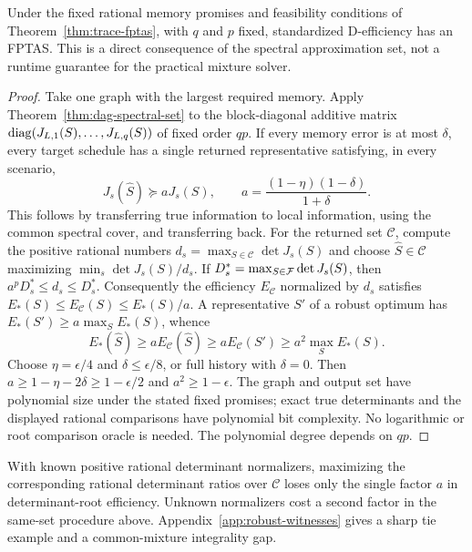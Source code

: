 \begin{corollary}\label{cor:robust-fptas}
Under the fixed rational memory promises and feasibility conditions of
Theorem~\ref{thm:trace-fptas}, with $q$ and $p$ fixed, standardized
D-efficiency has an FPTAS. This is a direct consequence of the spectral
approximation set, not a runtime guarantee for the practical mixture solver.
\end{corollary}
\begin{proof}
Take one graph with the largest required memory. Apply
Theorem~\ref{thm:dag-spectral-set} to the block-diagonal additive matrix
$\operatorname{diag}(J_{L,1}(S),\ldots,J_{L,q}(S))$ of fixed order $qp$.
If every memory error is at most $\delta$, every target schedule has a
single returned representative satisfying, in every scenario,
\begin{equation}\label{eq:robust-cover-factor}
 J_s(\widehat S)\succeq aJ_s(S),\qquad
 a=\frac{(1-\eta)(1-\delta)}{1+\delta}.
\end{equation}
This follows by transferring true information to local information, using
the common spectral cover, and transferring back. For the returned set
$\mathcal C$, compute the positive rational numbers
$d_s=\max_{S\in\mathcal C}\det J_s(S)$ and choose $\widehat S\in\mathcal C$
maximizing $\min_s\det J_s(S)/d_s$. If
$D_s^*=\max_{S\in\mathcal F}\det J_s(S)$, then
$a^pD_s^*\le d_s\le D_s^*$. Consequently the efficiency $E_{\mathcal C}$
normalized by $d_s$ satisfies
$E_*(S)\le E_{\mathcal C}(S)\le E_*(S)/a$.
A representative $S'$ of a robust optimum has
$E_*(S')\ge a\max_S E_*(S)$, whence
\[
 E_*(\widehat S)\ge a E_{\mathcal C}(\widehat S)
 \ge a E_{\mathcal C}(S')\ge a^2\max_S E_*(S).
\]
Choose $\eta=\epsilon/4$ and $\delta\le\epsilon/8$, or full history
with $\delta=0$. Then $a\ge1-\eta-2\delta\ge1-\epsilon/2$ and
$a^2\ge1-\epsilon$. The graph and output set have polynomial size under
the stated fixed promises; exact true determinants and the displayed
rational comparisons have polynomial bit complexity. No logarithmic or
root comparison oracle is needed. The polynomial degree depends on $qp$.
\end{proof}
With known positive rational determinant normalizers, maximizing the
corresponding rational determinant ratios over $\mathcal C$ loses only the
single factor $a$ in determinant-root efficiency. Unknown normalizers cost a
second factor in the same-set procedure above. Appendix~\ref{app:robust-witnesses}
gives a sharp tie example and a common-mixture integrality gap.

